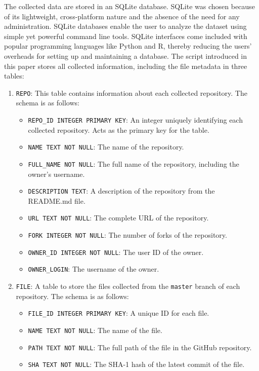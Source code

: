 \documentclass[10pt,conference]{IEEEtran}
\begin{document}
\begin{itemize}
		The collected data are stored in an SQLite database. SQLite was chosen because of its lightweight, cross-platform nature and the absence of the need for any administration. SQLite databases enable the user to analyze the dataset using simple yet powerful command line tools. SQLite interfaces come included with popular programming languages like Python and R, thereby reducing the users' overheads for setting up and maintaining a database. The script introduced in this paper stores all collected information, including the file metadata in three tables:
		\begin{enumerate}
			\item \texttt{REPO}: This table contains information about each collected repository. The schema is as follows:
			\begin{itemize}
				\item \texttt{REPO\_ID INTEGER PRIMARY KEY}: An integer uniquely identifying each collected repository. Acts as the primary key for the table.
				\item \texttt{NAME TEXT NOT NULL}: The name of the repository.
				\item \texttt{FULL\_NAME NOT NULL}: The full name of the repository, including the owner's username.
				\item \texttt{DESCRIPTION TEXT}: A description of the repository from the README.md file.
				\item \texttt{URL TEXT NOT NULL}: The complete URL of the repository.
				\item \texttt{FORK INTEGER NOT NULL}:  The number of forks of the repository.
				\item \texttt{OWNER\_ID INTEGER NOT NULL}: The user ID of the owner.
				\item \texttt{OWNER\_LOGIN}: The username of the owner.
			\end{itemize}
			\item \texttt{FILE}: A table to store the files collected from the \texttt{master} branch of each repository. The schema is as follows:
			\begin{itemize}
				\item \texttt{FILE\_ID INTEGER PRIMARY KEY}: A unique ID for each file.
				\item \texttt{NAME TEXT NOT NULL}: The name of the file.
				\item \texttt{PATH TEXT NOT NULL}: The full path of the file in the GitHub repository.
				\item \texttt{SHA TEXT NOT NULL}: The SHA-1 hash of the latest commit of the file.

\end{itemize}
\end{enumerate}
\end{itemize}
\end{document}

